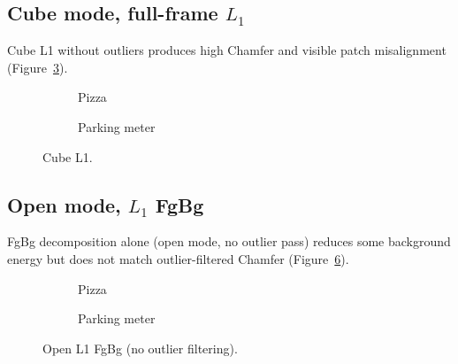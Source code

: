 \documentclass{report}
\begin{document}
\subsection{Cube mode, full-frame $L_1$}
\label{subsec:ablation_cube_l1}

Cube L1 without outliers produces high Chamfer and visible patch misalignment (Figure~\ref{fig:ablation_cube_l1}).

\begin{figure}[H]
    \centering
    \begin{subfigure}{\textwidth}
        \centering
        \caption{Pizza}
        \label{fig:ablation_cube_l1_pizza}
    \end{subfigure}
    \vspace{0.6em}
    \begin{subfigure}{\textwidth}
        \centering
        \caption{Parking meter}
        \label{fig:ablation_cube_l1_parking}
    \end{subfigure}
    \caption{Cube L1.}
    \label{fig:ablation_cube_l1}
\end{figure}

\subsection{Open mode, $L_1$ FgBg}
\label{subsec:ablation_open_l1_fgbg}

FgBg decomposition alone (open mode, no outlier pass) reduces some background energy but does not match outlier-filtered Chamfer (Figure~\ref{fig:ablation_open_l1_fgbg}).

\begin{figure}[H]
    \centering
    \begin{subfigure}{\textwidth}
        \centering
        \caption{Pizza}
        \label{fig:ablation_open_l1_fgbg_pizza}
    \end{subfigure}
    \vspace{0.6em}
    \begin{subfigure}{\textwidth}
        \centering
        \caption{Parking meter}
        \label{fig:ablation_open_l1_fgbg_parking}
    \end{subfigure}
    \caption{Open L1 FgBg (no outlier filtering).}
    \label{fig:ablation_open_l1_fgbg}
\end{figure}
\end{document}

